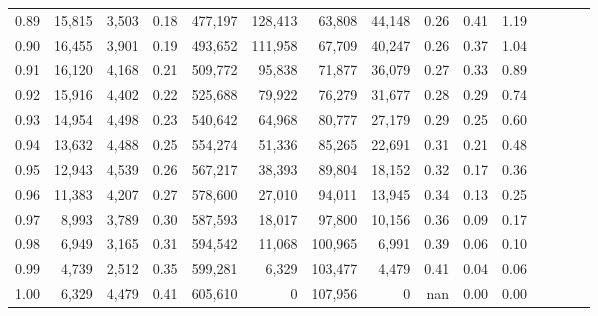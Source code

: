 \begin{tabular}{rrrcrrrrrrrrrrr}
0.89 &  15,815 &  3,503 &                                       0.18 &  477,197 &  128,413 &   63,808 &   44,148 &  0.26 &  0.41 &                         1.19 \\
0.90 &  16,455 &  3,901 &                                       0.19 &  493,652 &  111,958 &   67,709 &   40,247 &  0.26 &  0.37 &                         1.04 \\
0.91 &  16,120 &  4,168 &                                       0.21 &  509,772 &   95,838 &   71,877 &   36,079 &  0.27 &  0.33 &                         0.89 \\
0.92 &  15,916 &  4,402 &                                       0.22 &  525,688 &   79,922 &   76,279 &   31,677 &  0.28 &  0.29 &                         0.74 \\
0.93 &  14,954 &  4,498 &                                       0.23 &  540,642 &   64,968 &   80,777 &   27,179 &  0.29 &  0.25 &                         0.60 \\
0.94 &  13,632 &  4,488 &                                       0.25 &  554,274 &   51,336 &   85,265 &   22,691 &  0.31 &  0.21 &                         0.48 \\
0.95 &  12,943 &  4,539 &                                       0.26 &  567,217 &   38,393 &   89,804 &   18,152 &  0.32 &  0.17 &                         0.36 \\
0.96 &  11,383 &  4,207 &                                       0.27 &  578,600 &   27,010 &   94,011 &   13,945 &  0.34 &  0.13 &                         0.25 \\
0.97 &   8,993 &  3,789 &                                       0.30 &  587,593 &   18,017 &   97,800 &   10,156 &  0.36 &  0.09 &                         0.17 \\
0.98 &   6,949 &  3,165 &                                       0.31 &  594,542 &   11,068 &  100,965 &    6,991 &  0.39 &  0.06 &                         0.10 \\
0.99 &   4,739 &  2,512 &                                       0.35 &  599,281 &    6,329 &  103,477 &    4,479 &  0.41 &  0.04 &                         0.06 \\
1.00 &   6,329 &  4,479 &                                       0.41 &  605,610 &        0 &  107,956 &        0 &   nan &  0.00 &                         0.00 \\
\bottomrule
\end{tabular}
